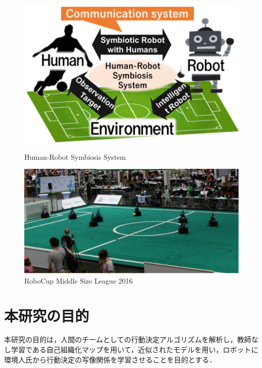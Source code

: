 \clearpage

\begin{figure}[ht]
  \begin{center}
  
    \includegraphics[clip,width=15.0cm]{figure/01_01_Human-Robot_Symbiosis_System.eps}
    \caption{Human-Robot Symbiosis System}
    \label{fig:01_01}
    
    \includegraphics[width=15.0cm]{figure/01_02_RoboCup_Middle_Size_League_2016.eps}
    \caption{RoboCup Middle Size League 2016}
    \label{fig:01_02}
    
  \end{center}
\end{figure}

\clearpage


\section{本研究の目的}%
本研究の目的は，人間のチームとしての行動決定アルゴリズムを解析し，教師なし学習である自己組織化マップを用いて，近似されたモデルを用い，ロボットに環境人氏から行動決定の写像関係を学習させることを目的とする．


